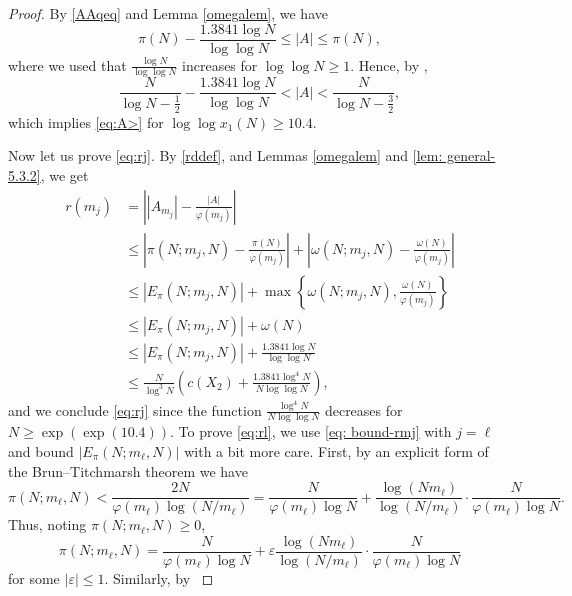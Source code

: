 \documentclass[12pt]{amsart}
\begin{document}
\begin{proof}
By \eqref{AAqeq} and Lemma \ref{omegalem}, we have
$$\pi(N) - \frac{1.3841 \log N}{\log \log N} \le |A| \le \pi(N),$$
where we used that $\frac{\log N}{\log \log N}$ increases for $\log \log N \ge 1$. Hence, by \cite[Theorem 2]{R-S},
\begin{equation}
    \frac{N}{\log N - \frac{1}{2}} - \frac{1.3841 \log N}{\log \log N} < |A| < \frac{N}{\log N - \frac{3}{2}},
\end{equation}
which implies \eqref{eq:A>} for $\log \log x_1(N) \ge 10.4$.\par
Now let us prove \eqref{eq:rj}. By \eqref{rddef}, and Lemmas \ref{omegalem} and \ref{lem: general-5.3.2}, we get
    \begin{align}
        r(m_j)&=\left||A_{m_j}|-\frac{|A|}{\varphi(m_j)}\right| \nonumber\\
        &\le\left|\pi(N;m_j,N)-\frac{\pi(N)}{\varphi(m_j)}\right|+\left|\omega(N;m_j,N)-\frac{\omega(N)}{\varphi(m_j)}\right| \nonumber\\
        &\le|E_{\pi}(N; m_j, N)|+\max\left\{\omega(N;m_j,N), \frac{\omega(N)}{\varphi(m_j)}\right\} \nonumber\\
        &\le |E_{\pi}(N; m_j, N)| + \omega(N) \nonumber\\
        &\le |E_{\pi}(N; m_j, N)| + \frac{1.3841 \log N}{\log \log N} \label{eq: bound-rmj}\\
        &\le \frac{N}{\log^3 N} \left( c(X_2) + \frac{1.3841 \log^4 N}{N \log \log N} \right), \nonumber
    \end{align}
    and we conclude \eqref{eq:rj} since the function $\frac{\log^4 N}{N \log \log N}$ decreases for $N \ge \exp(\exp(10.4))$.
    To prove \eqref{eq:rl}, we use \eqref{eq: bound-rmj} with $j = \ell$ and bound $|E_{\pi}(N; m_{\ell}, N)|$ with a bit more care. First, by an explicit form of the Brun--Titchmarsh theorem \cite[Theorem 2]{M-V} we have
    \begin{equation*}
        \pi(N;m_\ell,N)<\frac{2N}{\varphi(m_\ell)\log(N/m_\ell)}=\frac{N}{\varphi(m_\ell)\log N}+\frac{\log(Nm_\ell)}{\log(N/m_\ell)}\cdot\frac{N}{\varphi(m_\ell)\log N}.
    \end{equation*}
    Thus, noting $\pi(N;m_\ell,N)\ge 0$,
    \begin{equation*}
        \pi(N;m_\ell,N)=\frac{N}{\varphi(m_\ell)\log N}+\varepsilon\frac{\log(Nm_\ell)}{\log(N/m_\ell)}\cdot\frac{N}{\varphi(m_\ell)\log N}
    \end{equation*}
    for some $|\varepsilon|\le 1$. Similarly, by \cite[Theorem 1]{R-S}

\end{proof}
\end{document}
